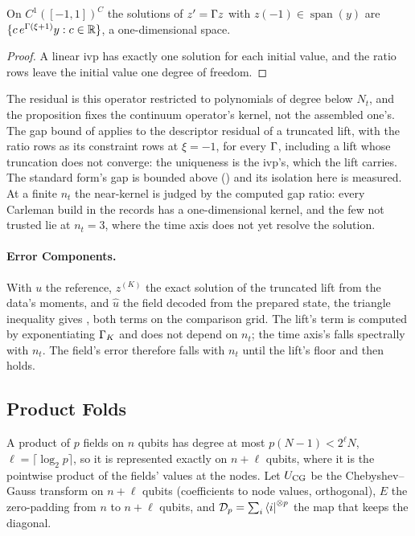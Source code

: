 \begin{proposition}
\label{prop:ivp-uniqueness}
On $C^1([-1,1])^C$ the solutions of $z'=\Gamma z$ with $z(-1)\in\operatorname{span}(y)$ are $\{c\,e^{\Gamma(\xi+1)}y:c\in\mathbb{R}\}$, a one-dimensional space.
\end{proposition}
\begin{proof}
A linear \gls{ivp} has exactly one solution for each initial value, and the ratio rows leave the initial value one degree of freedom.
\end{proof}
The residual is this operator restricted to polynomials of degree below $N_t$, and the proposition fixes the continuum operator's kernel, not the assembled one's. The gap bound of  applies to the descriptor residual of a truncated lift, with the ratio rows as its constraint rows at $\xi=-1$, for every $\Gamma$, including a lift whose truncation does not converge: the uniqueness is the \gls{ivp}'s, which the lift carries. The standard form's gap is bounded above () and its isolation here is measured. At a finite $n_t$ the near-kernel is judged by the computed gap ratio: every Carleman build in the records has a one-dimensional kernel, and the few not trusted lie at $n_t=3$, where the time axis does not yet resolve the solution.

\paragraph{Error Components.} With $u$ the reference, $z^{(K)}$ the exact solution of the truncated lift from the data's moments, and $\hat u$ the field decoded from the prepared state, the triangle inequality gives , both terms on the comparison grid. The lift's term is computed by exponentiating $\Gamma_K$ and does not depend on $n_t$; the time axis's falls spectrally with $n_t$. The field's error therefore falls with $n_t$ until the lift's floor and then holds.

\subsection{Product Folds}
\label{app:proof-fold}

A product of $p$ fields on $n$ qubits has degree at most $p(N-1)<2^\ell N$, $\ell=\lceil\log_2p\rceil$, so it is represented exactly on $n+\ell$ qubits, where it is the pointwise product of the fields' values at the nodes. Let $U_{\mathrm{CG}}$ be the Chebyshev--Gauss transform on $n+\ell$ qubits (coefficients to node values, orthogonal), $E$ the zero-padding from $n$ to $n+\ell$ qubits, and $\mathcal{D}_p=\sum_i\bra{i}^{\otimes p}$ the map that keeps the diagonal.

